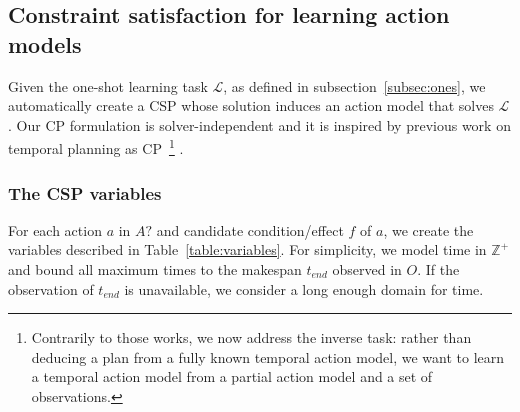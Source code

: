 \documentclass{ecai}
\begin{document}
\subsection{Constraint satisfaction for learning action models}
\label{subsec:CPformulation}



Given the one-shot learning task $\mathcal{L}$, as defined in subsection~\ref{subsec:ones}, we automatically create a CSP whose solution induces an action model that solves $\mathcal{L}$. Our CP formulation is solver-independent 
and it is inspired by previous work on temporal planning as CP~\cite{garrido2009constraint,vidal2006branching}\footnote{Contrarily to those works, we now address the inverse task: rather than deducing a plan from a fully known temporal action model, we want to learn a temporal action model from a partial action model and a set of observations.} .


\subsubsection{The CSP variables}

For each action $a$ in $A?$ and candidate condition/effect $f$ of $a$, we create the variables described in Table~\ref{table:variables}. For simplicity, we model time in $\mathbb{Z}^+$ and bound all maximum times to the makespan $t_{end}$ observed in $O$. If the observation of $t_{end}$ is unavailable, we consider a long enough domain for time.
\end{document}
